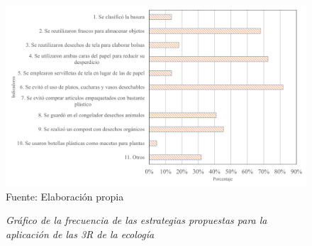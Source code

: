 \begin{figure}[h]
    \centering
    \captionsetup{singlelinecheck=false, justification=raggedright, labelsep=newline}
    \caption{\textit{Gráfico de la frecuencia de las estrategias propuestas para la aplicación de las 3R de la ecología}}
    \includegraphics[width=15cm]{Media/Grafico Lista de Cotejo.png}
    \\\RaggedRight Fuente: Elaboración propia
    \label{fig:grafico}
\end{figure}

\newpage